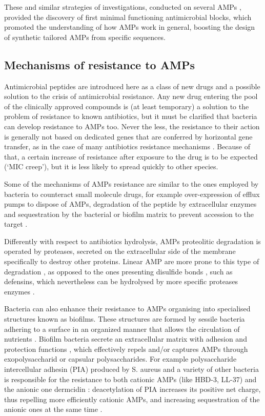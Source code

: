 These and similar strategies of investigations, conducted on several AMPs \cite{???}, provided the discovery of first minimal functioning antimicrobial blocks, which promoted the understanding of how AMPs work in general, boosting the design of synthetic tailored AMPs from specific sequences.


\subsection{Mechanisms of resistance to AMPs}

Antimicrobial peptides are introduced here as a class of new drugs and a possible solution to the crisis of antimicrobial resistance. Any new drug entering the pool of the clinically approved compounds is (at least temporary) a solution to the problem of resistance to known antibiotics, but it must be clarified that bacteria can develop resistance to AMPs too.
%
Never the less, the resistance to their action is generally not based on dedicated genes that are conferred by horizontal gene transfer, as in the case of many antibiotics resistance mechanisms \cite{Peschel2006}. Because of that, a certain increase of resistance after exposure to the drug is to be expected (`MIC creep'), but it is less likely to spread quickly to other species.

Some of the mechanisms of AMPs resistance are similar to the ones employed by bacteria to counteract small molecule drugs, for example over-expression of efflux pumps to dispose of AMPs, degradation of the peptide by extracellular enzymes and sequestration by the bacterial or biofilm matrix to prevent accession to the target \cite{Peschel2006}.

Differently with respect to antibiotics hydrolysis, AMPs proteolitic degradation is operated by proteases, secreted on the extracellular side of the membrane specifically to destroy other proteins. Linear AMP are more prone to this type of degradation \cite{Sieprawska-Lupa2004}, as opposed to the ones presenting disulfide bonds \cite{Peschel2006}, such as defensins, which nevertheless can be hydrolysed by more specific proteases enzymes \cite{Nelson2011}.

Bacteria can also enhance their resistance to AMPs organising into specialised structures known as biofilms. These structures are formed by sessile bacteria adhering to a surface in an organized manner that allows the circulation of nutrients \cite{Costerton1999}.
%
Biofilm bacteria secrete an extracellular matrix with adhesion and protection functions \cite{Jolivet-Gougeon2014}, which effectively repels and/or captures AMPs through exopolysaccharid or capsular polysaccharides.
%
For example polysaccharide intercellular adhesin (PIA) produced by S. aureus and a variety of other bacteria is responsible for the resistance to both cationic AMPs (like HBD-3, LL-37) and the anionic one dermcidin \cite{Vuong2004PIA}: deacetylation of PIA increases its positive net charge, thus repelling more efficiently cationic AMPs, and increasing sequestration of the anionic ones at the same time \cite{Vuong2004}.

